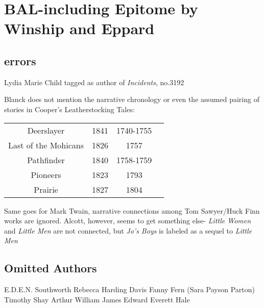 \documentclass[course, english]{Notes}
\begin{document}
\section{BAL-including Epitome by Winship and Eppard}
\subsection{errors}
\begin{outline}
\1 Lydia Marie Child tagged as author of \textit{Incidents}, no.3192

\1 Blanck does not mention the narrative chronology or even the assumed pairing of stories in Cooper's Leatherstocking Tales: 
\begin{table}
\centering
	{\begin{tabular}{ |c|c|c|c| }
			\hline
			 Deerslayer & 1841 & 1740-1755\\
			Last of the Mohicans & 1826 & 1757\\
			Pathfinder &  1840 & 1758-1759\\
			Pioneers &  1823 & 1793\\
			Prairie & 1827 & 1804\\
			\hline
	\end{tabular}}
\end{table}

\1 Same goes for Mark Twain, narrative connections among Tom Sawyer/Huck Finn works are ignored.
	\2 Alcott, however, seems to get something else- \textit{Little Women} and \textit{Little Men} are not connected, but \textit{Jo's Boys} is labeled as a sequel to \textit{Little Men}

\subsection{Omitted Authors}
E.D.E.N. Southworth
Rebecca Harding Davis
Fanny Fern (Sara Payson Parton)
Timothy Shay Arthur
William James
Edward Everett Hale

\end{outline}
\end{document}
